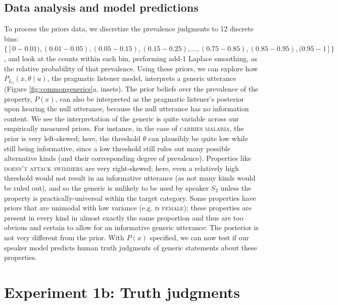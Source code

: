 \documentclass[12pt,letterpaper]{article}
\begin{document}
\subsection*{Data analysis and model predictions}

To process the priors data, we discretize the prevalence judgments to 12 discrete bins: $\{[0-0.01), (0.01-0.05), (0.05-0.15), (0.15-0.25),  ..., (0.75-0.85), (0.85-0.95), (0.95-1]\}$, and look at the counts within each bin, performing add-1 Laplace smoothing, as the relative probability of that prevalence. 
Using these priors, we can explore how $P_{L_{1}}(x , \theta \mid u)$, the pragmatic listener model, interprets a generic utterance (Figure \ref{fig:commongenerics}a, insets). 
The prior beliefs over the prevalence of the property, $P(x)$, can also be interpreted as the pragmatic listener's posterior upon hearing the null utterance, because the null utterance has no information content.
We see the interpretation of the generic is quite variable across our empirically measured priors.
For instance, in the case of \textsc{carries malaria}, the prior is very left-skewed; here, the threshold $\theta$ can plausibly be quite low while still being informative, since a low threshold still rules out many possible alternative kinds (and their corresponding degree of prevalence).
Properties like \textsc{doesn't attack swimmers} are very right-skewed; here, even a relatively high threshold would not result in an informative utterance (as not many kinds would be ruled out), and so the generic is unlikely to be used by speaker $S_2$ unless the property is practically-universal within the target category. 
Some properties have priors that are unimodal with low variance (e.g. \textsc{is female}); these properties are present in every kind in almost exactly the same proportion and thus are too obvious and certain to allow for an informative generic utterance: The posterior is not very different from the prior. 
With $P(x)$ specified, we can now test if our speaker model predicts human truth judgments of generic statements about these properties.


\section*{Experiment 1b: Truth judgments}

\end{document}
